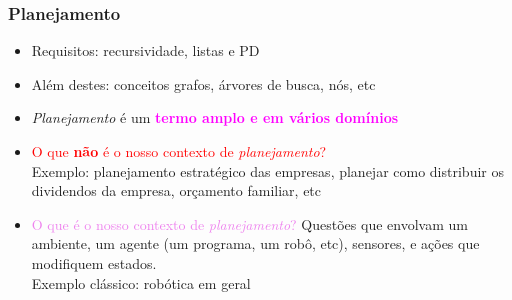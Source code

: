 \begin{frame}[fragile]

 \frametitle{Planejamento}

   \begin{block}{}
     \begin{itemize}
      \item Requisitos: recursividade, listas e PD
       \pause
      
      \item Além destes: conceitos grafos, árvores de busca, nós, etc
       
       \pause
      \item \textit{Planejamento} é um \textcolor{magenta}{\textbf{termo amplo e em vários domínios}} 
      
       \pause
      \item \textcolor{red}{O que \textbf{não} é o nosso contexto de \textit{planejamento}?}\\
      Exemplo: planejamento estratégico das empresas, planejar como distribuir
      os dividendos da empresa, orçamento familiar,  etc
      
      \pause
       \item \textcolor{violet}{O que é o nosso contexto de \textit{planejamento}?}
       \pause
       Questões que envolvam um ambiente, um agente (um programa, um robô, etc), sensores,
      e ações que modifiquem estados.\\ Exemplo clássico:  robótica em geral
 
    \end{itemize}
    
    \end{block}
    
\end{frame}



